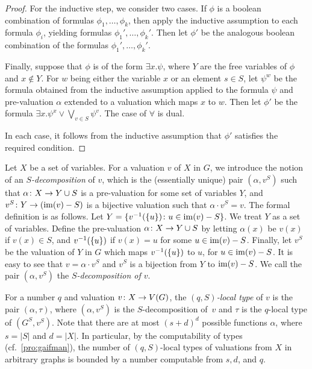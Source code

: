 \begin{proof}
For the inductive step, we consider two cases.
If $\phi$ is a boolean combination of formulas $\phi_1,\ldots,\phi_k$, then 
apply the inductive assumption to each formula $\phi_i$,
yielding formulas $\phi_1',\ldots,\phi_k'$. Then let $\phi'$ be the analogous boolean combination of the formulas $\phi_1',\ldots,\phi_k'$.

Finally, suppose that $\phi$ is of the form $\exists x.\psi$, where   $Y$ are the free variables of $\phi$ and $x\not \in Y$.
 For $w$ being either the variable $x$ 
or an element $s\in S$, 
let $\psi^w$ be the formula obtained from the inductive assumption applied to the formula $\psi$ 
and pre-valuation $\alpha$ extended to a valuation which maps  $x$ to $w$. 
Then let $\phi'$
be the formula $\exists x.\psi^x \lor \bigvee_{v\in S}\psi^v$.
The case of $\forall$ is dual.

In each case, it follows from the inductive assumption that $\phi'$ 
satisfies the required condition.
\end{proof}



Let $X$ be a set of variables.
For a valuation  $v$ of $X$ in $G$, we introduce the notion of an \emph{$S$-decomposition} of $v$,  
which is the (essentially unique) pair $(\alpha,v^S)$
such that $\alpha\colon X\to Y\cup S$ is a pre-valuation
for some set of variables $Y$,
and $v^S\colon Y\to (\mathrm{im}(v)-S)$ is a bijective valuation such that 
$\alpha\cdot v^S=v$. The formal definition is as follows.
Let $Y=\{v^{-1}(\{u\})\colon u\in \mathrm{im}(v)-S\}$. We treat $Y$ as a set of variables. 
Define the pre-valuation $\alpha\colon X\to Y\cup S$
by letting $\alpha(x)$ be $v(x)$ if $v(x)\in S$,
and $v^{-1}(\{u\})$ if $v(x)=u$ for some $u\in \mathrm{im}(v)-S$.
Finally, let $v^S$ be the valuation of $Y$ in $G$ which
maps  $v^{-1}(\{u\})$ to $u$, for $u\in \mathrm{im}(v)-S$.
It is easy to see that $v=\alpha\cdot v^S$ and $v^S$ is a bijection from $Y$ 
to $\mathrm{im}(v)-S$. We call the pair $(\alpha,v^S)$ the \emph{$S$-decomposition of $v$}.



For a number $q$ and valuation $v\colon X \to V(G)$, the \emph{$(q,S)$-local type} of $v$ 
is the pair $(\alpha,\tau)$,
where $(\alpha,v^S)$ is the $S$-decomposition of~$v$
and $\tau$ is the $q$-local type of   $(G^S,v^S)$.
Note that there are at most  $(s+d)^d$ possible functions $\alpha$, where $s=|S|$ and $d=|X|$. In particular, by the computability of types (cf.~\cref{pro:gaifman}), 
the number of $(q,S)$-local types of valuations from $X$
in arbitrary graphs is bounded by 
a number computable from $s,d$, and $q$.




